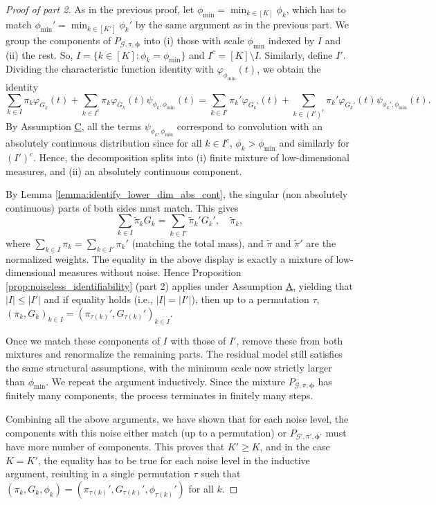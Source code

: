\documentclass[bj,authoryear]{imsart}
\theoremstyle{plain}
\theoremstyle{remark}
\def\bphi{{\boldsymbol\phi}}
\def\cG{\mathcal{G}}
\begin{document}
\begin{appendix}
\begin{proof}[Proof of part 2]
     As in the previous proof, let $\phi_{\min}=\min_{k\in[K]} \phi_k$, which has to match $\phi_{\min}'=\min_{k\in[K']} \phi_k'$ by the same argument as in the previous part. We group the components of $P_{\cG, \pi,\bphi}$ into (i) those with scale $\phi_{\min}$ indexed by $I$ and (ii) the rest. So, $I=\{k\in[K]: \phi_k=\phi_{\min}\}$ and $I^c=[K]\setminus I$. Similarly, define $I'$. Dividing the characteristic function identity with $\varphi_{\phi_{\min}}(t)$, we obtain the identity
    $$\sum_{k\in I} \pi_k \varphi_{G_k}(t) + \sum_{k\in I^c}\pi_k \varphi_{G_k}(t)\psi_{\phi_k,\phi_{\min}}(t) = \sum_{k\in I'} \pi_k' \varphi_{G_k'}(t) + \sum_{k\in (I')^c}\pi_k' \varphi_{G_k'}(t)\psi_{\phi_k',\phi_{\min}}(t).$$
    By Assumption \hyperref[assume:C]{C}, all the terms $\psi_{\phi_k,\phi_{\min}}$ correspond to convolution with an absolutely continuous distribution since for all $k\in I^c$, $\phi_k>\phi_{\min}$ and similarly for $(I')^c$. Hence, the decomposition splits into (i) finite mixture of low-dimensional measures, and (ii) an absolutely continuous component.

     By Lemma \ref{lemma:identify_lower_dim_abs_cont}, the singular (non absolutely continuous) parts of both sides must match. This gives
     $$\sum_{k\in I} \tilde{\pi}_k G_k = \sum_{k\in I'} \tilde{\pi}_k' G_k', \quad \tilde{\pi}_k,$$
     where $\sum_{k\in I} \pi_k = \sum_{k\in I'} \pi_k'$ (matching the total mass), and $\tilde{\pi}$ and $\tilde{\pi}'$ are the normalized weights. The equality in the above display is exactly a mixture of low-dimensional measures without noise. Hence Proposition \ref{prop:noiseless_identifiability} (part 2) applies under Assumption \hyperref[assume:A]{A}, yielding that $|I|\leq |I'|$ and if equality holds (i.e., $|I|=|I'|$), then up to a permutation $\tau$, $(\pi_k, G_k)_{k\in I} = (\pi_{\tau(k)}', G_{\tau(k)}')_{k\in I}$. 

     Once we match these components of $I$ with those of $I'$, remove these from both mixtures and renormalize the remaining parts. The residual model still satisfies the same structural assumptions, with the minimum scale now strictly larger than $\phi_{\min}$. We repeat the argument inductively. Since the mixture $P_{\cG, \pi, \bphi}$ has finitely many components, the process terminates in finitely many steps. 

     Combining all the above arguments, we have shown that for each noise level, the components with this noise either match (up to a permutation) or $P_{\cG',\pi',\bphi'}$ must have more number of components. This proves that $K'\geq K$, and in the case $K=K'$, the equality has to be true for each noise level in the inductive argument, resulting in a single permutation $\tau$ such that $(\pi_k, G_k, \phi_k) = (\pi_{\tau(k)}', G_{\tau(k)}', \phi_{\tau(k)}')$ for all $k$.
\end{proof}


\end{appendix}
\end{document}
